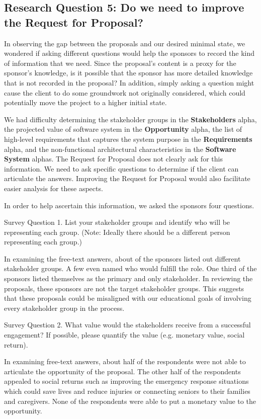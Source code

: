 \documentclass[conference]{IEEEtran}
\begin{document}
\subsection{Research Question 5: Do we need to
improve the Request for Proposal?}

In observing the gap between the proposals and our desired minimal
state, we wondered if asking different questions would help the sponsors
to record the kind of information that we need. Since the proposal's
content is a proxy for the sponsor's knowledge, is it possible that the
sponsor has more detailed knowledge that is not recorded in the proposal?
In addition, simply asking a question might cause the client to do some
groundwork not originally considered, which could potentially move the
project to a higher initial state. 

We had difficulty determining the stakeholder groups in the
 \textbf{Stakeholders} alpha, the projected value of software system in the
 \textbf{Opportunity} alpha, the list of high-level requirements that captures
the system purpose in the \textbf{Requirements} alpha, and the non-functional
architectural characteristics in the \textbf{Software System} alphas. The
Request for Proposal does not clearly ask for this information. We need
to ask specific questions to determine if the client can articulate the
answers. Improving the Request for Proposal would also facilitate
easier analysis for these aspects.

In order to help ascertain this information, we asked the sponsors four
questions.

{Survey Question 1. List your stakeholder groups and identify who will be
representing each group. (Note: Ideally there should be a different
person representing each group.)}

In examining the free-text answers, about  of the sponsors listed
out different stakeholder groups. A few even named who would fulfill the
role. One third of the sponsors listed themselves as the primary and
only stakeholder. In reviewing the proposals, these sponsors are not the
target stakeholder groups. This suggests that these proposals could be
misaligned with our educational goals of involving every stakeholder
group in the process.

{Survey Question 2. What value would the stakeholders receive from a successful engagement? If possible, please quantify the value (e.g. monetary
value, social return).}

In examining free-text answers, about half of the respondents were not
able to articulate the opportunity of the proposal. The other half of
the respondents appealed to social returns such as improving the
emergency response situations which could save lives and reduce injuries
or connecting seniors to their families and caregivers. None of the
respondents were able to put a monetary value to the opportunity.
\end{document}
